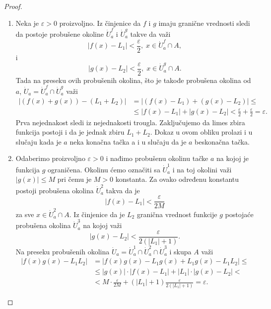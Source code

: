 \documentclass[a4paper,12pt]{article}
\theoremstyle{plain}
\theoremstyle{definition}
\theoremstyle{remark}
\begin{document}
\begin{proof}
    \begin{enumerate}[label=\alph*)]
        \item Neka je $\varepsilon > 0$ proizvoljno. Iz činjenice da $f$ i $g$ imaju granične vrednosti sledi da postoje probušene okoline $\dot{U}_a^f$ i $\dot{U}_a^g$ takve da važi
        \[ |f(x) - L_1| < \frac{\varepsilon}{2}, \; x \in \dot{U}_a^f \cap A, \]
        i
        \[ |g(x) - L_2| < \frac{\varepsilon}{2}, \; x \in \dot{U}_a^g \cap A. \]
        Tada na preseku ovih probušenih okolina, što je takođe probušena okolina od $a$, $\dot{U}_a = \dot{U}_a^f \cap \dot{U}_a^g$ važi
        \begin{align*}
            |(f(x) + g(x)) - (L_1 + L_2)| &= |(f(x) - L_1) + (g(x) - L_2)| \le \\
            &\le |f(x) - L_1| + |g(x) - L_2| < \frac{\varepsilon}{2} + \frac{\varepsilon}{2} = \varepsilon.
        \end{align*}
        Prva nejednakost sledi iz nejednakosti trougla. Zaključujemo da limes zbira funkcija postoji i da je jednak zbiru $L_1 + L_2$. Dokaz u ovom obliku prolazi i u slučaju kada je $a$ neka konačna tačka a i u slučaju da je $a$ beskonačna tačka.
        
        \item Odaberimo proizvoljno $\varepsilon > 0$ i nađimo probušenu okolinu tačke $a$ na kojoj je funkcija $g$ ograničena. Okolinu ćemo označiti sa $\dot{U}_a^1$ i na toj okolini važi $|g(x)| \le M$ pri čemu je $M > 0$ konstanta. Za ovako određenu konstantu postoji probušena okolina $\dot{U}_a^2$ takva da je
        \[ |f(x) - L_1| < \frac{\varepsilon}{2M} \]
        za sve $x \in \dot{U}_a^2 \cap A$. Iz činjenice da je $L_2$ granična vrednost funkcije $g$ postojaće probušena okolina $\dot{U}_a^3$ na kojoj važi
        \[ |g(x) - L_2| < \frac{\varepsilon}{2(|L_1| + 1)}. \]
        Na preseku probušenih okolina $\dot{U}_a = \dot{U}_a^1 \cap \dot{U}_a^2 \cap \dot{U}_a^3$ i skupa $A$ važi
        \begin{align*}
            |f(x)g(x) - L_1L_2| &= |f(x)g(x) - L_1g(x) + L_1g(x) - L_1L_2| \le \\
            &\le |g(x)| \cdot |f(x) - L_1| + |L_1| \cdot |g(x) - L_2| < \\
            &< M \cdot \frac{\varepsilon}{2M} + (|L_1| + 1) \frac{\varepsilon}{2(|L_1| + 1)} = \varepsilon.
        \end{align*}


\end{enumerate}
\end{proof}
\end{document}
